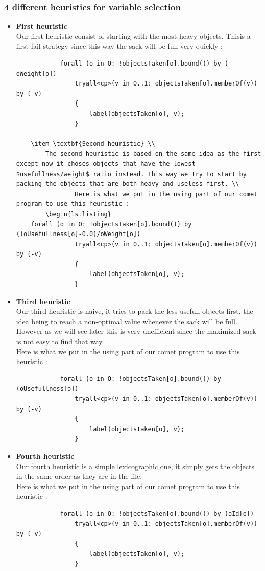 \documentclass{eplDoc}
\begin{document}
\subsubsection{4 different heuristics for variable selection}
\begin{itemize}
	\item \textbf{First heuristic} \\ 
		Our first heuristic consist of starting with the most heavy objects. Thisis a first-fail strategy since this way the sack will be full very quickly : 
		\begin{lstlisting}
            forall (o in O: !objectsTaken[o].bound()) by (-oWeight[o])
                tryall<cp>(v in 0..1: objectsTaken[o].memberOf(v)) by (-v)
                {
                    label(objectsTaken[o], v);
                } 
                
	\item \textbf{Second heuristic} \\ 
		The second heuristic is based on the same idea as the first except now it choses objects that have the lowest $usefullness/weight$ ratio instead. This way we try to start by packing the objects that are both heavy and useless first. \\ 
				Here is what we put in the using part of our comet program to use this heuristic :
		\begin{lstlisting}
	forall (o in O: !objectsTaken[o].bound()) by ((oUsefullness[o]-0.0)/oWeight[o])
                tryall<cp>(v in 0..1: objectsTaken[o].memberOf(v)) by (-v)
                {
                    label(objectsTaken[o], v);
                } 
		\end{lstlisting}
	\item \textbf{Third heuristic} \\ 
	Our third heuristic is naive, it tries to pack the less usefull objects first, the idea being to reach a non-optimal value whenever the sack will be full. However as we will see later this is very unefficient since the maximized sack is not easy to find that way. \\ 
				Here is what we put in the using part of our comet program to use this heuristic :
		\begin{lstlisting}
			forall (o in O: !objectsTaken[o].bound()) by (oUsefullness[o])
                tryall<cp>(v in 0..1: objectsTaken[o].memberOf(v)) by (-v)
                {
                    label(objectsTaken[o], v);
                } 
		\end{lstlisting}
	\item \textbf{Fourth heuristic} \\ 
		Our fourth heuristic is a simple lexicographic one, it simply gets the objects in the same order as they are in the file. \\
				Here is what we put in the using part of our comet program to use this heuristic :
		\begin{lstlisting}
			forall (o in O: !objectsTaken[o].bound()) by (oId[o])
                tryall<cp>(v in 0..1: objectsTaken[o].memberOf(v)) by (-v)
                {
                    label(objectsTaken[o], v);
                } 
		\end{lstlisting}
	
\end{itemize}
\end{document}
